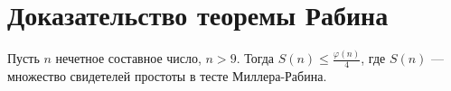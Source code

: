 % 
% 
\section{Доказательство теоремы Рабина}
\begin{thm}[Рабин]
    Пусть $ n$ нечетное составное число,  $ n > 9$. Тогда  $ S(n) \le \frac{\varphi (n)}{4}$, где $ S(n)$ --- множество свидетелей простоты в тесте Миллера-Рабина.
\end{thm}
% 
